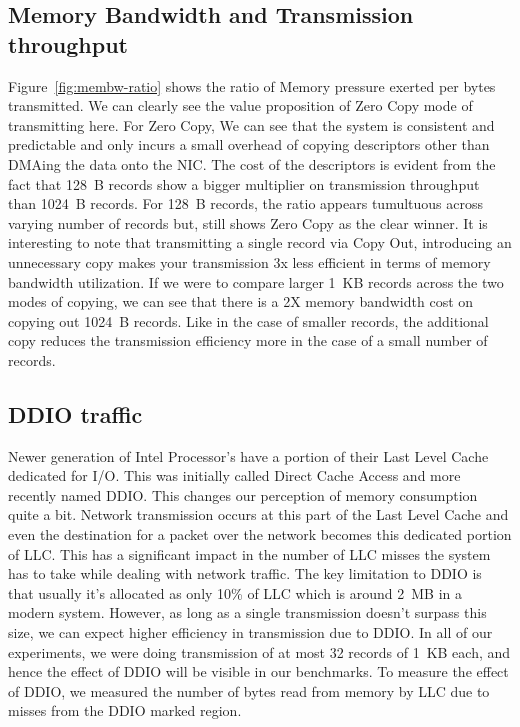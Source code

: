 \subsection{Memory Bandwidth and Transmission throughput}
\label{sec:membw-savings}
Figure~\ref{fig:membw-ratio} shows the ratio of Memory pressure exerted per bytes transmitted. We can clearly see the value proposition of 
Zero Copy mode of transmitting here. For Zero Copy, We can see that the system is consistent and predictable and only incurs a small overhead of 
copying descriptors other than DMAing the data onto the NIC. The cost of the descriptors is evident from the fact that 128~B records show 
a bigger multiplier on transmission throughput than 1024~B records. For 128~B records, the ratio appears tumultuous across varying number of records 
 but, still shows Zero Copy as the clear winner. It is interesting to note that transmitting a single record via Copy Out, 
 introducing an unnecessary copy makes your transmission 3x less efficient in terms of memory bandwidth utilization.
  If we were to compare larger 1~KB records across the two modes of copying, we can see that there is a 
 2X memory bandwidth cost on copying out 1024~B records. Like in the case of smaller records, the additional copy reduces the 
 transmission efficiency more in the case of a small number of records.



\subsection{DDIO traffic}
Newer generation of Intel Processor's have a portion of their Last Level Cache dedicated for I/O. This was initially called Direct Cache Access 
and more recently named DDIO. This changes our perception of memory consumption quite a bit. Network transmission occurs at this part of the Last Level Cache 
and even the destination for a packet over the network becomes this dedicated portion of LLC. This has a significant impact in the number of LLC misses the system 
has to take while dealing with network traffic. The key limitation to DDIO is that usually it's allocated as only 10\% of LLC which is around 2~MB in a modern system. 
However, as long as a single transmission doesn't surpass this size, we can expect higher efficiency in transmission due to DDIO. In all of our experiments, we were doing transmission of 
at most 32 records of 1~KB each, and hence the effect of DDIO will be visible in our benchmarks. To measure the 
effect of DDIO, we measured the number of bytes read from memory by LLC due to misses from the DDIO marked region. 

